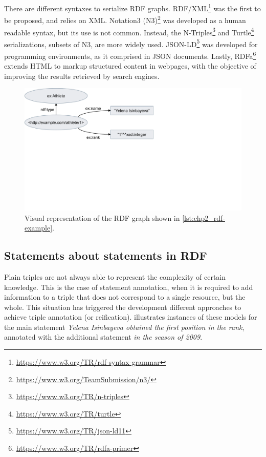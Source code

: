 There are different syntaxes to serialize RDF graphs. RDF/XML\footnote{\url{https://www.w3.org/TR/rdf-syntax-grammar}} was the first to be proposed, and relies on XML. Notation3 (N3)\footnote{\url{https://www.w3.org/TeamSubmission/n3/}} was developed as a human readable syntax, but its use is not common. Instead, the N-Triples\footnote{\url{https://www.w3.org/TR/n-triples}} and Turtle\footnote{\url{https://www.w3.org/TR/turtle}} serializations, subsets of N3, are more widely used. JSON-LD\footnote{\url{https://www.w3.org/TR/json-ld11}} was developed for programming environments, as it comprised in JSON documents. Lastly, RDFa\footnote{\url{https://www.w3.org/TR/rdfa-primer}} extends HTML to markup structured content in webpages, with the objective of improving the results retrieved by search engines. 



\begin{figure}[t]
\centering
\includegraphics[width=0.6\linewidth]{figures/chp2_rdf-example.pdf}
\caption[RDF graph example]{Visual representation of the RDF graph shown in \cref{lst:chp2_rdf-example}.}
\label{fig:chp2_rdf-example}
\end{figure}

\subsection{Statements about statements in RDF}


Plain triples are not always able to represent the complexity of certain knowledge. This is the case of statement annotation, when it is required to add information to a triple that does not correspond to a single resource, but the whole. This situation has triggered the development different approaches to achieve triple annotation (or reification).  illustrates instances of these models for the main statement \textit{Yelena Isinbayeva obtained the first position in the rank}, annotated with the additional statement \textit{in the season of 2009}. 

